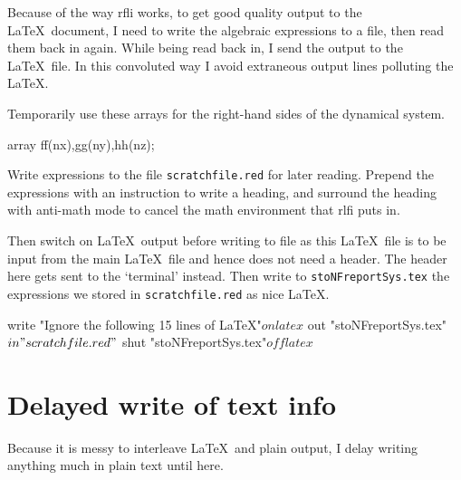 \documentclass[11pt,a5paper]{article}
\begin{document}
Because of the way rfli works, to get good quality output to the \LaTeX\ document, I need to write the algebraic expressions to a file, then read them back in again.
While being read back in, I send the output to the \LaTeX\ file.
In this convoluted way I avoid extraneous output lines polluting the \LaTeX. 

Temporarily use these arrays for the right-hand sides of the dynamical system.
\begin{reduce}
array ff(nx),gg(ny),hh(nz);
\end{reduce}

Write expressions to the file \verb|scratchfile.red| for later reading.
Prepend the expressions with an instruction to write a heading, and surround the heading with anti-math mode to cancel the math environment that rlfi puts in.

Then switch on \LaTeX\ output before writing to file as this \LaTeX\ file is to be input from the main \LaTeX\ file and hence does not need a header.
The header here gets sent to the `terminal' instead.
Then write to \verb|stoNFreportSys.tex| the expressions we stored in \verb|scratchfile.red| as nice \LaTeX.
\begin{reduce}
write "Ignore the following 15 lines of LaTeX"$
on latex$
out "stoNFreportSys.tex"$
in "scratchfile.red"$
shut "stoNFreportSys.tex"$
off latex$
\end{reduce}



\section{Delayed write of text info}
\label{sec:dwti}

Because it is messy to interleave \LaTeX\ and plain output, I delay writing anything much in plain text until here.
\end{document}
